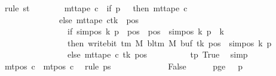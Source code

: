 \begin{isabellebody}
\ {\isacharparenleft}{\kern0pt}rule\ st{\isacharparenright}{\kern0pt}\isanewline
\ \ \ \ \ \ \isamarkupfalse%
\ {\isachardoublequoteopen}mt{\isacharunderscore}{\kern0pt}tape\ c{\isacharprime}{\kern0pt}{\isacharprime}{\kern0pt}\ {\isacharequal}{\kern0pt}\ {\isacharparenleft}{\kern0pt}if\ p\ {\isacharequal}{\kern0pt}\ {}\ then\ mt{\isacharunderscore}{\kern0pt}tape\ c{\isacharprime}{\kern0pt}\isanewline
\ \ \ \ \ \ \ \ \ \ \ \ \ \ else\ {\isacharparenleft}{\kern0pt}mt{\isacharunderscore}{\kern0pt}tape\ c{\isacharprime}{\kern0pt}{\isacharparenright}{\kern0pt}{\isacharparenleft}{\kern0pt}tk\ {\isacharcolon}{\kern0pt}{\isacharequal}{\kern0pt}\ {\isacharparenleft}{\kern0pt}{\isasymlambda}pos{\isachardot}{\kern0pt}\isanewline
\ \ \ \ \ \ \ \ \ \ \ \ \ \ \ \ if\ sim{\isacharunderscore}{\kern0pt}pos\ {\isacharquery}{\kern0pt}k\ p\ {\isasymle}\ pos\ {\isasymand}\ pos\ {\isacharless}{\kern0pt}\ sim{\isacharunderscore}{\kern0pt}pos\ {\isacharquery}{\kern0pt}k\ p\ {\isacharplus}{\kern0pt}\ {\isacharquery}{\kern0pt}k\isanewline
\ \ \ \ \ \ \ \ \ \ \ \ \ \ \ \ then\ write{\isacharunderscore}{\kern0pt}bit\ {\isacharparenleft}{\kern0pt}{\isasymGamma}{\isacharunderscore}{\kern0pt}tm\ M{\isacharparenright}{\kern0pt}\ {\isacharparenleft}{\kern0pt}bl{\isacharunderscore}{\kern0pt}tm\ M{\isacharparenright}{\kern0pt}\ {\isacharparenleft}{\kern0pt}buf\ tk{\isacharparenright}{\kern0pt}\ {\isacharparenleft}{\kern0pt}pos\ {\isacharminus}{\kern0pt}\ sim{\isacharunderscore}{\kern0pt}pos\ {\isacharquery}{\kern0pt}k\ p{\isacharparenright}{\kern0pt}\isanewline
\ \ \ \ \ \ \ \ \ \ \ \ \ \ \ \ else\ mt{\isacharunderscore}{\kern0pt}tape\ c{\isacharprime}{\kern0pt}\ tk\ pos{\isacharparenright}{\kern0pt}{\isacharparenright}{\kern0pt}{\isacharparenright}{\kern0pt}{\isachardoublequoteclose}\isanewline
\ \ \ \ \ \ \ \ \isamarkupfalse%
\ tp\ True\ \isamarkupfalse%
\ simp\isanewline
\ \ \ \ \ \ \isamarkupfalse%
\ {\isachardoublequoteopen}mt{\isacharunderscore}{\kern0pt}pos\ c{\isacharprime}{\kern0pt}{\isacharprime}{\kern0pt}\ {\isacharequal}{\kern0pt}\ mt{\isacharunderscore}{\kern0pt}pos\ c{\isacharprime}{\kern0pt}{\isachardoublequoteclose}\ \isamarkupfalse%
\ {\isacharparenleft}{\kern0pt}rule\ ps{\isacharparenright}{\kern0pt}\isanewline
\ \ \ \ \isamarkupfalse%
\isanewline
\ \ \isamarkupfalse%
\isanewline
\ \ \ \ \isamarkupfalse%
\ False\isanewline
\ \ \ \ \isamarkupfalse%
\ pge{}{\isacharcolon}{\kern0pt}\ {\isachardoublequoteopen}{}\ {\isasymle}\ p{\isachardoublequoteclose}\ \isamarkupfalse%

\end{isabellebody}
